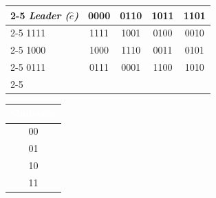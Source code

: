 \begin{center}
\renewcommand{\arraystretch}{1.4}
\small
\begin{tabular}{l|c|c|c|c|}
    \cline{2-5}
    \rowcolor{white} \textit{Leader ($\hat{e}$)} & \textbf{0000} & \textbf{0110} & \textbf{1011} & \textbf{1101} \\ \cline{2-5}
    \rowcolor{rowblue} \cellcolor{white} 1111 & 1111 & 1001 & 0100 & 0010 \\ \cline{2-5}
    \rowcolor{white} 1000 & 1000 & 1110 & 0011 & 0101 \\ \cline{2-5}
    \rowcolor{rowblue} \cellcolor{white} 0111 & 0111 & 0001 & 1100 & 1010 \\ \cline{2-5}
\end{tabular}
\quad
\begin{tabular}{|c|}
    \hline
    \rowcolor{headerblue} \textcolor{white}{\textbf{Sindrome}} \\ \hline
    \rowcolor{white} 00 \\ \hline
    \rowcolor{rowblue} 01 \\ \hline
    \rowcolor{white} 10 \\ \hline
    \rowcolor{rowblue} 11 \\ \hline
\end{tabular}
\end{center}